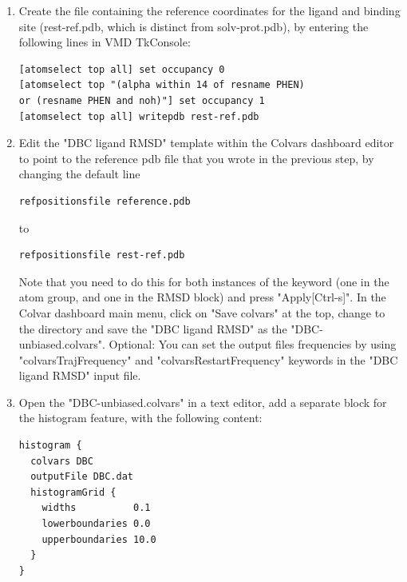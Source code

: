 \documentclass[9pt,tutorial]{livecoms}
\newcommand{\grace}[1]{\textcolor{red}{GB: #1}}
\begin{document}
\begin{enumerate}[left=0pt .. \parindent]
\begin{enumerate}
\item Create the file containing the reference coordinates for the ligand and binding site  (rest-ref.pdb, which is distinct from solv-prot.pdb), by entering the following lines in VMD TkConsole:
\begin{verbatim}
[atomselect top all] set occupancy 0
[atomselect top "(alpha within 14 of resname PHEN) 
or (resname PHEN and noh)"] set occupancy 1
[atomselect top all] writepdb rest-ref.pdb
\end{verbatim}
\item Edit the "DBC ligand RMSD" template within the Colvars dashboard editor to point to the reference pdb file that you wrote in the previous step, by changing the default line
\begin{verbatim}
refpositionsfile reference.pdb
\end{verbatim} 
to 
\begin{verbatim}
refpositionsfile rest-ref.pdb
\end{verbatim} 
Note that you need to do this for both instances of the keyword (one in the atom group, and one in the RMSD block) and press "Apply[Ctrl-s]".
In the Colvar dashboard main menu, click on "Save colvars" at the top, change to the directory and save the "DBC ligand RMSD" as the "DBC-unbiased.colvars".
Optional: You can set the output files frequencies by using "colvarsTrajFrequency" and "colvarsRestartFrequency" keywords in the "DBC ligand RMSD" input file.
\item Open the "DBC-unbiased.colvars" in a text editor, add a separate block for the histogram feature, with the following content:
\begin{verbatim}
histogram {
  colvars DBC
  outputFile DBC.dat
  histogramGrid {
    widths          0.1 
    lowerboundaries 0.0
    upperboundaries 10.0
  }
}
\end{verbatim}



\end{enumerate}
\end{enumerate}
\end{document}
